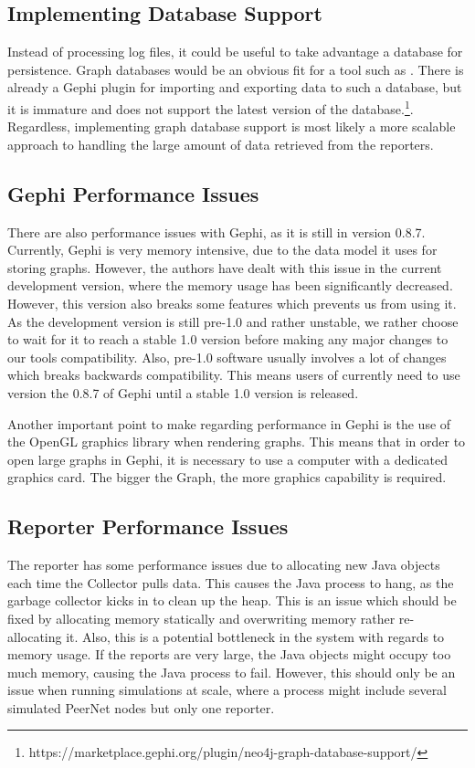 \subsection{Implementing Database Support}

Instead of processing log files, it could be useful to take advantage a
database for persistence. Graph databases would be an obvious fit for a
tool such as \demo{}. There is already a Gephi plugin for importing and
exporting data to such a database, but it is immature and does not
support the latest version of the
database.\footnote{https://marketplace.gephi.org/plugin/neo4j-graph-database-support/}.
Regardless, implementing graph database support is most likely a more
scalable approach to handling the large amount of data retrieved from
the reporters.

\subsection{Gephi Performance Issues}

There are also performance issues with Gephi, as it is still in version
0.8.7. Currently, Gephi is very memory intensive, due to the data model
it uses for storing graphs. However, the authors have dealt with this
issue in the current development version, where the memory usage has
been significantly decreased. However, this version also breaks some
features which prevents us from using it. As the development version is
still pre-1.0 and rather unstable, we rather choose to wait for it to
reach a stable 1.0 version before making any major changes to our tools
compatibility. Also, pre-1.0 software usually involves a lot of changes
which breaks backwards compatibility. This means users of \demo{}
currently need to use version the 0.8.7 of Gephi until a stable 1.0
version is released.

Another important point to make regarding performance in Gephi is the
use of the OpenGL graphics library when rendering graphs. This means
that in order to open large graphs in Gephi, it is necessary to use a
computer with a dedicated graphics card. The bigger the Graph, the more
graphics capability is required.

\subsection{Reporter Performance Issues}

The reporter has some performance issues due to allocating new Java
objects each time the Collector pulls data. This causes the Java process to
hang, as the garbage collector kicks in to clean up the heap. This is an
issue which should be fixed by allocating memory statically and
overwriting memory rather re-allocating it. Also, this is a potential bottleneck
in the system with regards to memory usage. If the reports are very large, the Java
objects might occupy too much  memory, causing the Java process to
fail. However, this should only be an issue when  running simulations at
scale, where a process might include several simulated PeerNet nodes but only one
reporter.

